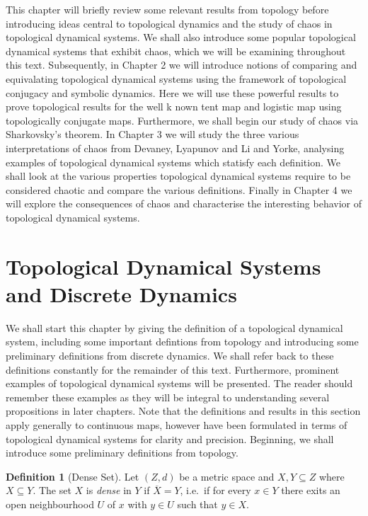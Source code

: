 \documentclass[11pt,a4paper,oneside]{memoir}
\theoremstyle{plain}
\theoremstyle{definition}
\newtheorem{defn}[thm]{Definition}
\begin{document}
This chapter will briefly review some relevant results from topology before introducing ideas central to topological dynamics and the study of chaos in topological dynamical systems. We shall also introduce some popular topological dynamical systems that exhibit chaos, which we will be examining throughout this text. Subsequently, in Chapter 2 we will introduce notions of comparing and equivalating topological dynamical systems using the framework of topological conjugacy and symbolic dynamics. Here we will use these powerful results to prove topological results for the well k   nown tent map and logistic map using topologically conjugate maps. Furthermore, we shall begin our study of chaos via Sharkovsky's theorem. In Chapter 3 we will study the three various interpretations of chaos from Devaney, Lyapunov and Li and Yorke, analysing examples of topological dynamical systems which statisfy each definition. We shall look at the various properties topological dynamical systems require to be considered chaotic and compare the various definitions. Finally in Chapter 4 we will explore the consequences of chaos and characterise the interesting behavior of topological dynamical systems.

\section{Topological Dynamical Systems and Discrete Dynamics} \label{sec:dynsys}
We shall start this chapter by giving the definition of a topological dynamical system, including some important defintions from topology and introducing some preliminary definitions from discrete dynamics. We shall refer back to these definitions constantly for the remainder of this text. Furthermore, prominent examples of topological dynamical systems will be presented. The reader should remember these examples as they will be integral to understanding several propositions in later chapters. Note that the definitions and results in this section apply generally to continuous maps, however have been formulated in terms of topological dynamical systems for clarity and precision. Beginning, we shall introduce some preliminary definitions from topology.

\begin{defn}[Dense Set] \label{defn:dense}
    Let $(Z, d)$ be a metric space and $X, Y \subseteq Z$ where $X \subseteq Y$. The set $X$ is \emph{dense} in $Y$ if $\overline{X} = Y$, i.e.\ if for every $x \in Y$ there exits an open neighbourhood $U$ of $x$ with $y \in U$ such that $y \in X$.
\end{defn}
\end{document}
